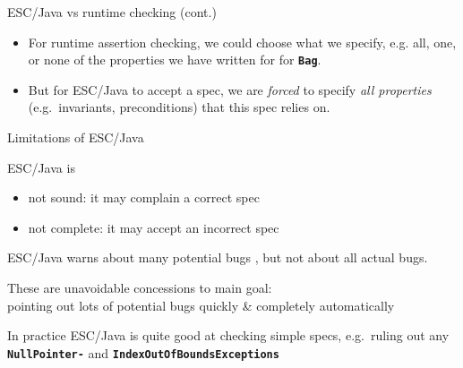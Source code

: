 \documentclass[
nocolorBG,
slideColor,
pdf,
erik,
]{prosper}
\newcommand{\code}[1]{{\rm \texttt{\textbf{\small #1}}}}
\begin{document}

\begin{slide}{ESC/Java vs runtime checking (cont.)}
\vspace*{-3ex}
\begin{itemize}
\item
For {\green runtime assertion checking}, we could {\green choose
what we specify}, e.g. all, one, or none of the properties
we have written for for \code{Bag}.
\item
But for {\blue ESC/Java} to accept a spec, we are
{\em {\blue forced}}  to specify {\em {\blue all properties}}
(e.g.\ invariants, preconditions)
that this spec relies on.
\end{itemize}
\end{slide}

\begin{slide}{Limitations of ESC/Java}
\vspace*{-3ex}

ESC/Java is
\begin{itemize}
\item {\blue not sound}: it may {\green complain a correct spec}
\item {\blue not complete}: it may {\green accept an incorrect spec}
\end{itemize}
ESC/Java warns about {\green many potential bugs} , but {\green not about all actual bugs.}

\medskip
These are unavoidable concessions to main goal:\\
{\green pointing out lots of potential bugs quickly \& completely automatically}

\medskip

In practice ESC/Java is quite good at checking
simple specs, e.g.\ ruling out any
\code{NullPointer-}
and \code{IndexOutOfBounds\-Exceptions}

\end{slide}
\end{document}
